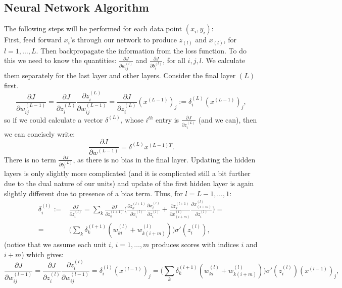 \documentclass{article} %
\begin{document}
\subsection{Neural Network Algorithm}
The following steps will be performed for each data point $(x_i, y_i)$:\\
First, feed forward $x_i$'s through our network to produce $z_{(l)}$ and $x_{(l)}$, for $l = 1,\dots ,L$. Then backpropagate the information from the loss function. To do this we need to know the quantities: $\frac{\partial J}{\partial w_{ij}^{(l)} }$ and $\frac{\partial J}{\partial b_{i}^{(l)} }$, for all $i,j,l$. We calculate them separately for the last layer and other layers. Consider the final layer $(L)$ first.
\begin{equation}
\frac{\partial J}{\partial w_{ij}^{(L-1)} } = \frac{\partial J}{\partial z_i^{(L)} }\frac{\partial z_i^{(L)}}{\partial w_{ij}^{(L-1)} } = \frac{\partial J}{\partial z_i^{(L)} } (x^{(L-1)})_j := \delta_i^{(L)}(x^{(L-1)})_j,
\end{equation}
so if we could calculate a vector $\delta^{(L)}$, whose $i^{th}$ entry is $\frac{\partial J}{\partial z_i^{(L)} }$ (and we can), then we can concisely write:
\begin{equation}
\frac{\partial J}{\partial w^{(L-1)} } = \delta^{(L)}x^{(L-1)T}.
\end{equation}
There is no term $\frac{\partial J}{\partial b_{i}^{(L)}}$, as there is no bias in the final layer. Updating the hidden layers is only slightly more complicated (and it is complicated still a bit further due to the dual nature of our units) and update of the first hidden layer is again slightly different due to presence of a bias term. Thus, for $l = L-1,\dots,1$:
\begin{equation}
\begin{split}
\delta_i^{(l)}:=& \frac{\partial J}{\partial z_i^{(l)} } = \sum_{k}\frac{\partial J}{\partial z_k^{(l+1)} }\bigg (\frac{\partial z_k^{(l+1)}}{\partial x_i^{(l)} }\frac{\partial x_{i}^{(l)}}{\partial z_i^{(l)} } + \frac{\partial z_k^{(l+1)}}{\partial x_{(i+m)}^{(l)} } \frac{\partial x_{(i+m)}^{(l)}}{\partial z_i^{(l)} }\bigg ) = \\
=&\bigg (\sum_k \delta_k^{(l+1)}(w_{ki}^{(l)}+w_{k(i+m)}^{(l)})\bigg )\sigma'(z_i^{(l)}),
\end{split}
\end{equation}
(notice that we assume each unit $i$, $i=1,\dots,m$ produces scores with indices $i$ and $i+m$) which gives:
\begin{equation}
\frac{\partial J}{\partial w_{ij}^{(l-1)} } = \frac{\partial J}{\partial z_i^{(l)} }\frac{\partial z_i^{(l)}}{\partial w_{ij}^{(l-1)} } = \delta_i^{(l)}(x^{(l-1)})_j =\bigg (\sum_k \delta_k^{(l+1)}(w_{ki}^{(l)}+w_{k(i+m)}^{(l)})\bigg )\sigma'(z_i^{(l)})(x^{(l-1)})_j,
\end{equation}
\end{document}

